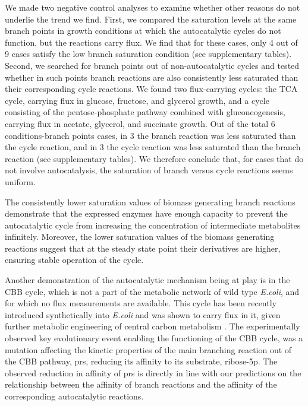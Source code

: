    We made two negative control analyses to examine whether other reasons do not underlie the trend we find.
    First, we compared the saturation levels at the same branch points in growth conditions at which the autocatalytic cycles do not function, but the reactions carry flux.
    We find that for these cases, only 4 out of 9 cases satisfy the low branch saturation condition (see supplementary tables).
    Second, we searched for branch points out of non-autocatalytic cycles and tested whether in such points branch reactions are also consistently less saturated than their corresponding cycle reactions.
    We found two flux-carrying cycles: the TCA cycle, carrying flux in glucose, fructose, and glycerol growth, and a cycle consisting of the pentose-phosphate pathway combined with gluconeogenesis, carrying flux in acetate, glycerol, and succinate growth.
    Out of the total 6 conditions-branch points cases, in 3 the branch reaction was less saturated than the cycle reaction, and in 3 the cycle reaction was less saturated than the branch reaction (see supplementary tables).
    We therefore conclude that, for cases that do not involve autocatalysis, the saturation of branch versus cycle reactions seems uniform.
    

    The consistently lower saturation values of biomass generating branch reactions demonstrate that the expressed enzymes have enough capacity to prevent the autocatalytic cycle from increasing the concentration of intermediate metabolites infinitely.
    Moreover, the lower saturation values of the biomass generating reactions suggest that at the steady state point their derivatives are higher, ensuring stable operation of the cycle.

    Another demonstration of the autocatalytic mechanism being at play is in the CBB cycle, which is not a part of the metabolic network of wild type \emph{E.coli}, and for which no flux measurements are available.
    This cycle has been recently introduced synthetically into \emph{E.coli} and was shown to carry flux in it, given further metabolic engineering of central carbon metabolism \cite{Antonovsky2016-jy}.
    The experimentally observed key evolutionary event enabling the functioning of the CBB cycle, was a mutation affecting the kinetic properties of the main branching reaction out of the CBB pathway, prs, reducing its affinity to its substrate, ribose-5p.
    The observed reduction in affinity of prs is directly in line with our predictions on the relationship between the affinity of branch reactions and the affinity of the corresponding autocatalytic reactions.

